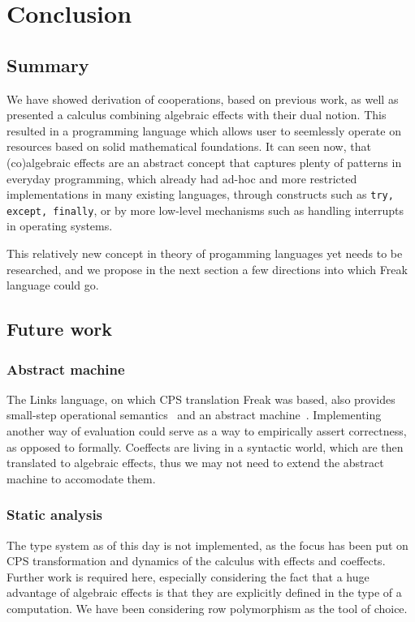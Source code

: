 \documentclass[declaration,shortabstract]{iithesis}
\theoremstyle{definition} \newtheorem{definition}{Definition}[chapter]
\theoremstyle{remark} \newtheorem{remark}[definition]{Observation}
\theoremstyle{plain} \newtheorem{theorem}[definition]{Theorem}
\theoremstyle{plain} \newtheorem{lemma}[definition]{Lemma}
\begin{document}
\chapter{Conclusion}\label{chapter:conclusion}
\section{Summary}

    We have showed derivation of cooperations, based on previous work, as well
    as presented a calculus combining algebraic effects with their dual notion.
    This resulted in a programming language which allows user to seemlessly
    operate on resources based on solid mathematical foundations. It can seen now,
    that (co)algebraic effects are an abstract concept that captures plenty of
    patterns in everyday programming, which already had ad-hoc and more
    restricted implementations in many existing languages, through constructs
    such as \verb!try, except, finally!, or by more low-level mechanisms
    such as handling interrupts in operating systems.

    This relatively new concept in theory of progamming languages yet needs to
    be researched, and we propose in the next section a few directions into
    which Freak language could go.

\section{Future work}

    \subsection{Abstract machine}

    The Links language, on which CPS translation Freak was based, also provides
    small-step operational semantics~\cite{handlers-cps} and an abstract
    machine~\cite{liberating-effects}. Implementing another way of evaluation
    could serve as a way to empirically assert correctness, as opposed to formally.
    Coeffects are living in a syntactic world, which are then translated to
    algebraic effects, thus we may not need to extend the abstract machine to
    accomodate them.

    \subsection{Static analysis}

    The type system as of this day is not implemented, as the focus has been put
    on CPS transformation and dynamics of the calculus with effects and coeffects.
    Further work is required here, especially considering the fact that a huge
    advantage of algebraic effects is that they are explicitly defined in the
    type of a computation. We have been considering row polymorphism as the
    tool of choice.
\end{document}
